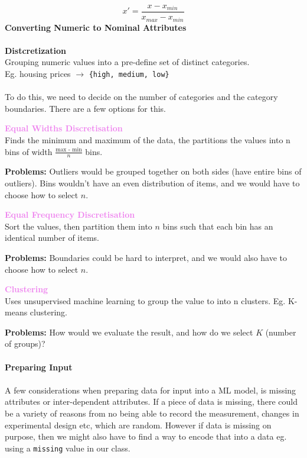 \documentclass[a4paper,10pt]{article}
\begin{document}
\begin{equation*}
	x' = \frac{x - x_{min}}{x_{max} - x_{min}}
\end{equation*}
\newline
\newline
\textcolor{Periwinkle}{\textbf{Converting Numeric to Nominal Attributes}}\\\\
\textbf{Distcretization}\\
Grouping numeric values into a pre-define set of distinct categories. \\
Eg. housing prices $\rightarrow$ \texttt{\{high, medium, low\}} \\\\
To do this, we need to decide on the number of categories and the category boundaries. There are a few options for this.
\begin{shaded}
	\noindent \textcolor{Violet}{\textbf{Equal Widths Discretisation}} \\
	Finds the minimum and maximum of the data, the partitions the values into n bins of width $\frac{\text{max - min}}{n}$ bins.
\end{shaded}
\noindent \textbf{Problems:} Outliers would be grouped together on both sides (have entire bins of outliers). Bins wouldn't have an even distribution of items, and we would have to choose how to select $n$.
\newpage
\begin{shaded}
	\noindent \textcolor{Violet}{\textbf{Equal Frequency Discretisation}} \\
	Sort the values, then partition them into $n$ bins such that each bin has an identical number of items. 
\end{shaded}
\noindent \textbf{Problems:} Boundaries could be hard to interpret, and we would also have to choose how to select $n$. 
\begin{shaded}
	\noindent \textcolor{Violet}{\textbf{Clustering}} \\
	Uses unsupervised machine learning to group the value to into n clusters. Eg. K-means clustering.
\end{shaded}
\noindent \textbf{Problems:} How would we evaluate the result, and how do we select $K$ (number of groups)?\\\\
\textcolor{Periwinkle}{\textbf{Preparing Input}}\\\\
A few considerations when preparing data for input into a ML model, is missing attributes or inter-dependent attributes. If a piece of data is missing, there could be a variety of reasons from no being able to record the measurement, changes in experimental design etc, which are random. However if data is missing on purpose, then we might also have to find a way to encode that into a data eg. using a \texttt{missing} value in our class. \\\\
\end{document}
